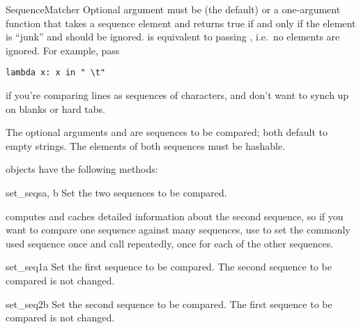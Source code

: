 \begin{classdesc}{SequenceMatcher}{}
  Optional argument  must be  (the default) or
  a one-argument function that takes a sequence element and returns
  true if and only if the element is ``junk'' and should be ignored.
   is equivalent to passing , i.e.\ no
  elements are ignored.  For example, pass

\begin{verbatim}
lambda x: x in " \t"
\end{verbatim}

  if you're comparing lines as sequences of characters, and don't want
  to synch up on blanks or hard tabs.

  The optional arguments  and  are sequences to be
  compared; both default to empty strings.  The elements of both
  sequences must be hashable.
\end{classdesc}


 objects have the following methods:

\begin{methoddesc}{set_seqs}{a, b}
  Set the two sequences to be compared.
\end{methoddesc}

 computes and caches detailed information about
the second sequence, so if you want to compare one sequence against
many sequences, use  to set the commonly used
sequence once and call  repeatedly, once for each
of the other sequences.

\begin{methoddesc}{set_seq1}{a}
  Set the first sequence to be compared.  The second sequence to be
  compared is not changed.
\end{methoddesc}

\begin{methoddesc}{set_seq2}{b}
  Set the second sequence to be compared.  The first sequence to be
  compared is not changed.
\end{methoddesc}


